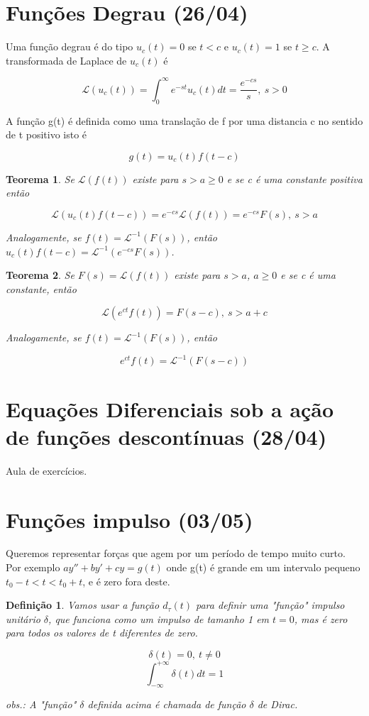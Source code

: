 \documentclass[12pt]{article}
\newtheorem{theorem}{Teorema}[section]
\newtheorem{definition}{Definição}
\begin{document}
\section{Funções Degrau (26/04)}
Uma função degrau é do tipo $u_c (t) = 0$ se $t < c$ e $u_c (t) = 1$ se $t \geq c$. A transformada de Laplace de $u_c(t)$ é

$$\mathscr{L}(u_c (t)) = \int_0^\infty e^{-s t} u_c(t) d t = \frac{e^{-c s}}{s}, \ s > 0$$

A função g(t) é definida como uma translação de f por uma distancia c no sentido de t positivo isto é 

$$g(t) = u_c(t) f(t-c)$$

\begin{theorem}
    Se $\mathscr{L}(f(t))$ existe para $s > a \geq 0$ e se c é uma constante positiva então
    
    $$\mathscr{L}(u_c(t) f(t - c)) = e^{-cs} \mathscr{L}(f(t)) = e^{-cs} F(s), \ s > a$$
    
    Analogamente, se $f(t) = \mathscr{L}^{-1} (F(s))$, então $u_c(t) f(t-c) = \mathscr{L}^{-1} (e^{-c s} F(s))$.
\end{theorem}

\begin{theorem}
    Se $F(s) = \mathscr{L}(f(t))$ existe para $s > a$, $a \geq 0$ e se c é uma constante, então
    
    $$\mathscr{L}(e^{ct} f(t)) = F(s-c), \ s > a + c$$
    
    Analogamente, se $f(t) = \mathscr{L}^{-1} (F(s))$, então
    
    $$e^{c t} f(t) = \mathscr{L}^{-1} (F(s - c))$$
\end{theorem}

\section{Equações Diferenciais sob a ação de funções descontínuas (28/04)}

Aula de exercícios.

\section{Funções impulso (03/05)}
Queremos representar forças que agem por um período de tempo muito curto. Por exemplo $ay'' + by' + c y = g(t)$ onde g(t) é grande em um intervalo pequeno $t_0 - t < t < t_0 + t$, e é zero fora deste. 

\begin{definition}
    Vamos usar a função $d_\tau (t)$ para definir uma "função" impulso unitário $\delta$, que funciona como um impulso de tamanho 1 em $t = 0$, mas é zero para todos os valores de t diferentes de zero.
    
    $$\delta (t) = 0, \ t \neq 0$$
    $$\int_{- \infty}^{+ \infty} \delta (t) d t = 1$$
    
    obs.: A "função" $\delta$ definida acima é chamada de função $\delta$ de Dirac. 
\end{definition}
\end{document}
